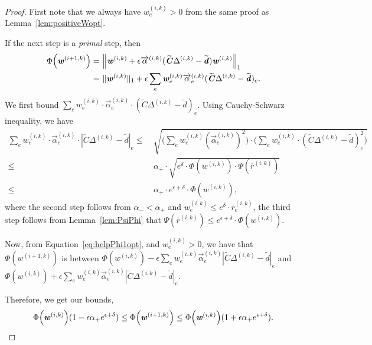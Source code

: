 \documentclass[11pt]{article}
\renewcommand{\norm}[1]{\ensuremath{\left\lVert #1 \right\rVert}}
\let\originalleft\left
\let\originalright\right
\renewcommand{\left}{\mathopen{}\mathclose\bgroup\originalleft}
\renewcommand{\right}{\aftergroup\egroup\originalright}
\newcommand\dd{\boldsymbol{\mathit{d}}}
\newcommand\ww{\boldsymbol{\mathit{w}}}
\newcommand\rrbar{\overline{\boldsymbol{\mathit{r}}}}
\newcommand\CC{\boldsymbol{\mathit{C}}}
\newcommand{\wt}{\widetilde}
\begin{document}
\begin{proof}
First note that we always have $\ww_e^{(i,k)} > 0$ from the same proof as Lemma~\ref{lem:positiveWopt}.

 If the next step is a \emph{primal} step, then 
\begin{align}\label{eq:helpPhi1opt}
\Phi\left(\ww^{( i+1,k)} \right) = &~ \norm{ \ww^{( i,k)} + \epsilon \overrightarrow{\alpha}^{(i,k)} (\wt{\CC}\Delta^{(i,k)}-\wt{\dd})\ww^{(i,k)}}_1 \notag \\
= &~ \|\ww^{(i,k)}\|_1 + \epsilon \sum_e \ww_e^{(i,k)} \overrightarrow{\alpha}_e^{(i,k)} (\wt{\CC}\Delta^{(i,k)}-\wt{\dd})_e.
\end{align}
We first bound $\sum_e \ww_e^{(i,k)} \cdot \overrightarrow{\alpha}_e^{(i,k)} \cdot (\wt{\CC} \Delta^{(i,k)} - \wt{\dd})_e$. Using Cauchy-Schwarz inequality, we have
\begin{align*}
\sum_e \ww_e^{(i,k)} \cdot \overrightarrow{\alpha}_e^{(i,k)} \cdot |\wt{\CC} \Delta^{(i,k)} - \wt{\dd}|_e \leq &~ \sqrt{\Big(\sum_e \ww_e^{(i,k)} (\overrightarrow{\alpha}_e^{(i,k)})^2\Big) \cdot \Big(\sum_e \ww_e^{(i,k)} \cdot (\wt{\CC} \Delta^{(i,k)} - \wt{\dd})_e^2\Big)} \\
\leq &~ \alpha_+ \cdot \sqrt{e^{\delta} \cdot \Phi(\ww^{(i,k)}) \cdot \Psi(\rrbar^{(i,k)})} \\
\leq &~ \alpha_+ \cdot e^{\epsilon+\delta} \cdot \Phi(\ww^{(i,k)}),
\end{align*}
where the second step follows from $\alpha_- < \alpha _+$ and $\ww_e^{(i,k)} \leq e^{\delta} \cdot \rrbar_e^{(i,k)}$, the third step follows from Lemma~\ref{lem:PsiPhi} that $\Psi(\rrbar^{(i,k)}) \leq e^{\epsilon+\delta} \cdot \Phi(\ww^{(i,k)})$.

Now, from Equation~\eqref{eq:helpPhi1opt}, and $\ww_e^{(i,k)} > 0$, we have that $\Phi(\ww^{(i+1,k)})$ is between $\Phi(\ww^{(i,k)}) - \epsilon \sum_e \ww_e^{(i,k)} \overrightarrow{\alpha}_e^{(i,k)} |\wt{\CC}\Delta^{(i,k)}-\wt{\dd}|_e$ and $\Phi(\ww^{(i,k)}) + \epsilon \sum_e \ww_e^{(i,k)} \overrightarrow{\alpha}_e^{(i,k)} |\wt{\CC}\Delta^{(i,k)}-\wt{\dd}|_e$. 

Therefore, we get our bounds,
\[
\Phi\left(\ww^{( i,k)} \right)(1-\epsilon\alpha_+ e^{\epsilon+\delta}) \leq  \Phi\left(\ww^{( i+1,k)} \right) \leq  \Phi\left(\ww^{( i,k)} \right)(1+\epsilon\alpha_+ e^{\epsilon+\delta}).
\]



\end{proof}
\end{document}

